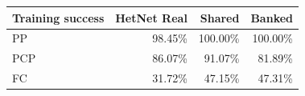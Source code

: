 \begin{tabular}{lrrr}\toprule Training success & HetNet Real & Shared & Banked\\\midrule
PP & 98.45\% & 100.00\% & 100.00\% \\
PCP & 86.07\% & 91.07\% & 81.89\% \\
FC & 31.72\% & 47.15\% & 47.31\% \\
\bottomrule\end{tabular}
